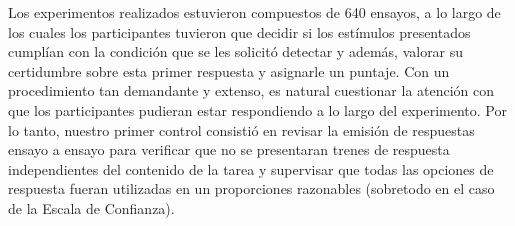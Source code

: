 Los experimentos realizados estuvieron compuestos de 640 ensayos, a lo largo de los cuales los participantes tuvieron que decidir si los estímulos presentados cumplían con la condición que se les solicitó detectar y además, valorar su certidumbre sobre esta primer respuesta y asignarle un puntaje. Con un procedimiento tan demandante y extenso, es natural cuestionar la atención con que los participantes pudieran estar respondiendo a lo largo del experimento. Por lo tanto, nuestro primer control consistió en revisar la emisión de respuestas ensayo a ensayo para verificar que no se presentaran trenes de respuesta independientes del contenido de la tarea y supervisar que todas las opciones de respuesta fueran utilizadas en un proporciones razonables (sobretodo en el caso de la Escala de Confianza).\\

